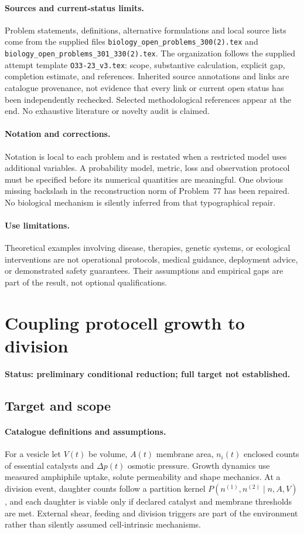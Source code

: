 \documentclass[11pt]{article}
\begin{document}
\paragraph{Sources and current-status limits.}
Problem statements, definitions, alternative formulations and local source lists
come from the supplied files
\texttt{biology\_open\_problems\_300(2).tex} and
\texttt{biology\_open\_problems\_301\_330(2).tex}.
The organization follows the supplied attempt template
\texttt{O33-23\_v3.tex}: scope, substantive calculation, explicit gap,
completion estimate, and references. Inherited source annotations and links are
catalogue provenance, not evidence that every link or current open status has
been independently rechecked. Selected methodological references appear at the
end. No exhaustive literature or novelty audit is claimed.

\paragraph{Notation and corrections.}
Notation is local to each problem and is restated when a restricted model uses
additional variables. A probability model, metric, loss and observation protocol
must be specified before its numerical quantities are meaningful. One obvious
missing backslash in the reconstruction norm of Problem~77 has been repaired.
No biological mechanism is silently inferred from that typographical repair.

\paragraph{Use limitations.}
Theoretical examples involving disease, therapies, genetic systems, or ecological
interventions are not operational protocols, medical guidance, deployment advice,
or demonstrated safety guarantees. Their assumptions and empirical gaps are part
of the result, not optional qualifications.


\section*{Coupling protocell growth to division}
\label{prob:297}
\noindent\textbf{Status: preliminary conditional reduction; full target not established.}
\subsection{Target and scope}
\paragraph{Catalogue definitions and assumptions.}
For a vesicle let $V(t)$ be volume, $A(t)$ membrane area, $n_i(t)$ enclosed counts of essential catalysts and $\Delta p(t)$ osmotic pressure. Growth dynamics use measured amphiphile uptake, solute permeability and shape mechanics. At a division event, daughter counts follow a partition kernel $P(n^{(1)},n^{(2)}\mid n,A,V)$, and each daughter is viable only if declared catalyst and membrane thresholds are met. External shear, feeding and division triggers are part of the environment rather than silently assumed cell-intrinsic mechanisms.
\end{document}

